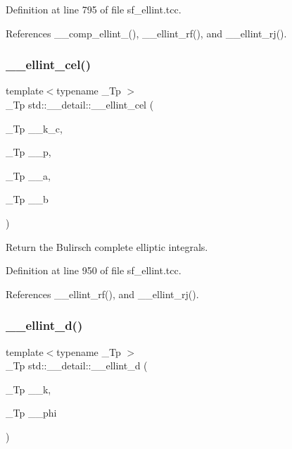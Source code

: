 Definition at line 795 of file sf\+\_\+ellint.\+tcc.



References \+\_\+\+\_\+comp\+\_\+ellint\+\_(), \+\_\+\+\_\+ellint\+\_\+rf(), and \+\_\+\+\_\+ellint\+\_\+rj().

\mbox{\label{namespacestd_1_1____detail_a7c7d04715f0d40e054299312db35e32d}} 
\subsubsection{\texorpdfstring{\+\_\+\+\_\+ellint\+\_\+cel()}{\_\_ellint\_cel()}}
{\footnotesize\ttfamily template$<$typename \+\_\+\+Tp $>$ \\
\+\_\+\+Tp std\+::\+\_\+\+\_\+detail\+::\+\_\+\+\_\+ellint\+\_\+cel (\begin{DoxyParamCaption}\item[{\+\_\+\+Tp}]{\+\_\+\+\_\+k\+\_\+c,  }\item[{\+\_\+\+Tp}]{\+\_\+\+\_\+p,  }\item[{\+\_\+\+Tp}]{\+\_\+\+\_\+a,  }\item[{\+\_\+\+Tp}]{\+\_\+\+\_\+b }\end{DoxyParamCaption})}

Return the Bulirsch complete elliptic integrals. 

Definition at line 950 of file sf\+\_\+ellint.\+tcc.



References \+\_\+\+\_\+ellint\+\_\+rf(), and \+\_\+\+\_\+ellint\+\_\+rj().

\mbox{\label{namespacestd_1_1____detail_a00da42d89830fd51e9934fe0c5e08b7f}} 
\subsubsection{\texorpdfstring{\+\_\+\+\_\+ellint\+\_\+d()}{\_\_ellint\_d()}}
{\footnotesize\ttfamily template$<$typename \+\_\+\+Tp $>$ \\
\+\_\+\+Tp std\+::\+\_\+\+\_\+detail\+::\+\_\+\+\_\+ellint\+\_\+d (\begin{DoxyParamCaption}\item[{\+\_\+\+Tp}]{\+\_\+\+\_\+k,  }\item[{\+\_\+\+Tp}]{\+\_\+\+\_\+phi }\end{DoxyParamCaption})}

